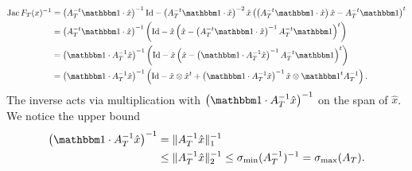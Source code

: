 \documentclass[a4paper]{article}
\begin{document}
        \begin{align*}
            \Jacobian F_T(x)^{-1}
            &= 
            \left( A_{T}^{-t} \vecone \cdot \hat x \right)^{-1}
            \Id
            - 
            \left( A_{T}^{-t} \vecone \cdot \hat x \right)^{-2}
            \hat x 
            \left( 
                \left( A_{T}^{-t} \vecone \cdot \hat x \right) \hat x
                -
                A_{T}^{-t} \vecone
            \right)^{t} 
            \\&= 
            \left( A_{T}^{-t} \vecone \cdot \hat x \right)^{-1}
            \left( 
                \Id
                - 
                \hat x 
                \left( 
                    \hat x
                    -
                    \left( A_{T}^{-t} \vecone \cdot \hat x \right)^{-1}
                    A_{T}^{-t} \vecone
                \right)^{t}
            \right)
            \\&= 
            \left( \vecone \cdot A_{T}^{-1} \hat x \right)^{-1}
            \left( 
                \Id
                - 
                \hat x 
                \left( 
                    \hat x
                    -
                    \left( \vecone \cdot A_{T}^{-1} \hat x \right)^{-1}
                    A_{T}^{-t} \vecone
                \right)^{t}
            \right)
            \\&= 
            \left( \vecone \cdot A_{T}^{-1} \hat x \right)^{-1}
            \left( 
                \Id - \hat x \otimes \hat x^{t}
                + 
                \left( \vecone \cdot A_{T}^{-1} \hat x \right)^{-1}
                \hat x \otimes \vecone^{t} A_{T}^{-1}
            \right)
            .
        \end{align*}
        The inverse acts via multiplication with $\left( \vecone \cdot A_{T}^{-1} \hat x \right)^{-1}$ on the span of $\hat x$.
        We notice the upper bound 
        \begin{align*}
            \left( \vecone \cdot A_{T}^{-1} \hat x \right)^{-1}
            &= 
            \| A_{T}^{-1} \hat x \|^{-1}_{1}
            \\&\leq  
            \| A_{T}^{-1} \hat x \|^{-1}_{2}
            \leq 
            \sigma_{\min}( A_{T}^{-1} )^{-1}
            = 
            \sigma_{\max}( A_{T} )
            .
        \end{align*}
\end{document}
